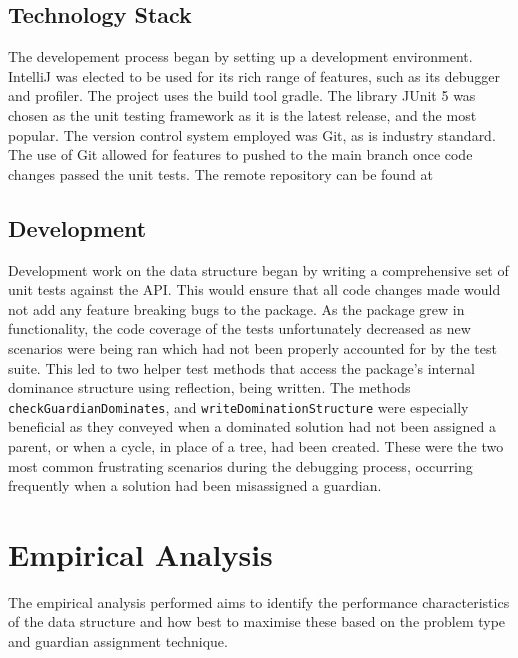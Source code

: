 \documentclass{ecmm427_assignment}
\begin{document}
\subsection{Technology Stack}
The developement process began by setting up a development environment. IntelliJ was elected to be used for its rich range of features, such as its debugger and profiler.  The project uses the build tool gradle. The library JUnit 5 was chosen as the unit testing framework as it is the latest release, and the most popular. The version control system employed was Git, as is industry standard. The use of Git allowed for features to pushed to the main branch once code changes passed the unit tests. The remote repository can be found at %

\subsection{Development}
Development work on the data structure began by writing a comprehensive set of unit tests against the API. This would ensure that all code changes made would not add any feature breaking bugs to the package. As the package grew in functionality, the code coverage of the tests unfortunately decreased as new scenarios were being ran which had not been properly accounted for by the test suite. This led to two helper test methods that access the package's internal dominance structure using reflection, being written. The methods \texttt{checkGuardianDominates}, and \texttt{writeDominationStructure} were especially beneficial as they conveyed when a dominated solution had not been assigned a parent, or when a cycle, in place of a tree, had been created. These were the two most common frustrating scenarios during the debugging process, occurring frequently when a solution had been misassigned a guardian.

\section{Empirical Analysis}
The empirical analysis performed aims to identify the performance characteristics of the data structure and how best to maximise these based on the problem type and guardian assignment technique.
\end{document}
